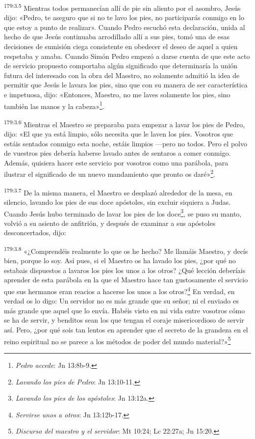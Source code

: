 \par 
\textsuperscript{179:3.5} Mientras todos permanecían allí de pie sin aliento por el asombro, Jesús dijo: «Pedro, te aseguro que si no te lavo los pies, no participarás conmigo en lo que estoy a punto de realizar». Cuando Pedro escuchó esta declaración, unida al hecho de que Jesús continuaba arrodillado allí a sus pies, tomó una de esas decisiones de sumisión ciega consistente en obedecer el deseo de aquel a quien respetaba y amaba. Cuando Simón Pedro empezó a darse cuenta de que este acto de servicio propuesto comportaba algún significado que determinaría la unión futura del interesado con la obra del Maestro, no solamente admitió la idea de permitir que Jesús le lavara los pies, sino que con su manera de ser característica e impetuosa, dijo: «Entonces, Maestro, no me laves solamente los pies, sino también las manos y la cabeza»\footnote{\textit{Pedro accede}: Jn 13:8b-9.}.

\par 
\textsuperscript{179:3.6} Mientras el Maestro se preparaba para empezar a lavar los pies de Pedro, dijo: «El que ya está limpio, sólo necesita que le laven los pies. Vosotros que estáis sentados conmigo esta noche, estáis limpios ---pero no todos. Pero el polvo de vuestros pies debería haberse lavado antes de sentaros a comer conmigo. Además, quisiera hacer este servicio por vosotros como una parábola, para ilustrar el significado de un nuevo mandamiento que pronto os daré»\footnote{\textit{Lavando los pies de Pedro}: Jn 13:10-11.}.

\par 
\textsuperscript{179:3.7} De la misma manera, el Maestro se desplazó alrededor de la mesa, en silencio, lavando los pies de sus doce apóstoles, sin excluir siquiera a Judas. Cuando Jesús hubo terminado de lavar los pies de los doce\footnote{\textit{Lavando los pies de los apóstoles}: Jn 13:12a.}, se puso su manto, volvió a su asiento de anfitrión, y después de examinar a sus apóstoles desconcertados, dijo:

\par 
\textsuperscript{179:3.8} «¿Comprendéis realmente lo que os he hecho? Me llamáis Maestro, y decís bien, porque lo soy. Así pues, si el Maestro os ha lavado los pies, ¿por qué no estabais dispuestos a lavaros los pies los unos a los otros? ¿Qué lección deberíais aprender de esta parábola en la que el Maestro hace tan gustosamente el servicio que sus hermanos eran reacios a hacerse los unos a los otros?\footnote{\textit{Servirse unos a otros}: Jn 13:12b-17.} En verdad, en verdad os lo digo: Un servidor no es más grande que su señor; ni el enviado es más grande que aquel que lo envía. Habéis visto en mi vida entre vosotros cómo se ha de servir, y benditos sean los que tengan el coraje misericordioso de servir así. Pero, ¿por qué sois tan lentos en aprender que el secreto de la grandeza en el reino espiritual no se parece a los métodos de poder del mundo material?»\footnote{\textit{Discurso del maestro y el servidor}: Mt 10:24; Lc 22:27a; Jn 15:20.}

